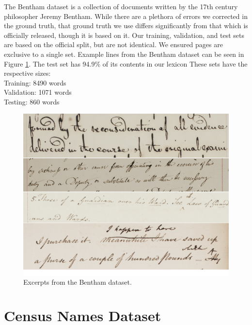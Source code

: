 \documentclass[ms,electronic,twosidetoc,letterpaper,chaptercenter,parttop,lol,lof,lot]{byumsphd}
\begin{document}
The Bentham dataset \cite{bentham} is a collection of documents written by the 17th century philosopher Jeremy Bentham. While there are a plethora of errors we corrected in the ground truth, that ground truth we use differs significantly from that which is officially released, though it is based on it. 
Our training, validation, and test sets are based on the official split, but are not identical.
We ensured pages are exclusive to a single set.
Example lines from the Bentham dataset can be seen in Figure \ref{fig:BenthamExamples}.
The test set has 94.9\% of its contents in our lexicon
These sets have the respective sizes:\\
\indent \indent Training: 8490 words\\
\indent \indent Validation: 1071 words\\
\indent \indent Testing: 860 words

\begin{figure}
    \centering
    \includegraphics[width=.9\textwidth]{bentham_examples}
    \caption{Excerpts from the Bentham dataset.}
    \label{fig:BenthamExamples}
\end{figure}

\section{Census Names Dataset}
\end{document}
